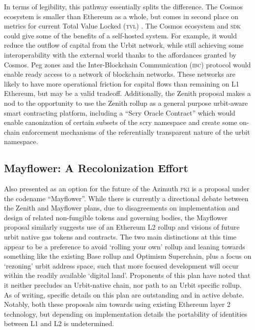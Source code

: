 \documentclass[twoside]{article}
\begin{document}
In terms of legibility, this pathway essentially splits the difference. The Cosmos ecosystem is smaller than Ethereum as a whole, but comes in second place on metrics for current Total Value Locked (\textsc{tvl}) \citep{CosmosTVL}.  The Cosmos ecosystem and \textsc{sdk} could give some of the benefits of a self-hosted system. For example, it would reduce the outflow of capital from the Urbit network, while still achieving some interoperability with the external world thanks to the affordances granted by Cosmos. Peg zones and the Inter-Blockchain Communication (\textsc{ibc}) protocol would enable ready access to a network of blockchain networks. These networks are likely to have more operational friction for capital flows than remaining on L1 Ethereum, but may be a valid tradeoff. Additionally, the Zenith proposal makes a nod to the opportunity to use the Zenith rollup as a general purpose urbit-aware smart contracting platform, including a ``Scry Oracle Contract'' which would enable canonization of certain subsets of the scry namespace and create some on-chain enforcement mechanisms of the referentially transparent nature of the urbit namespace.

\subsection{Mayflower: A Recolonization Effort}

Also presented as an option for the future of the Azimuth \textsc{pki} is a proposal under the codename ``Mayflower''. While there is currently a directional debate between the Zenith and Mayflower plans, due to disagreements on implementation and design of related non-fungible tokens and governing bodies, the Mayflower proposal similarly suggests use of an Ethereum L2 rollup and visions of future urbit native gas tokens and contracts. The two main distinctions at this time appear to be a preference to avoid `rolling your own' rollup and leaning towards something like the existing Base rollup and Optimism Superchain, plus a focus on `rezoning' urbit address space, such that more focused development will occur within the readily available `digital land'. Proponents of this plan have noted that it neither precludes an Urbit-native chain, nor path to an Urbit specific rollup. As of writing, specific details on this plan are outstanding and in active debate. Notably, both these proposals aim towards using existing Ethereum layer 2 technology, but depending on implementation details the portability of identities between L1 and L2 is undetermined. 
\end{document}
